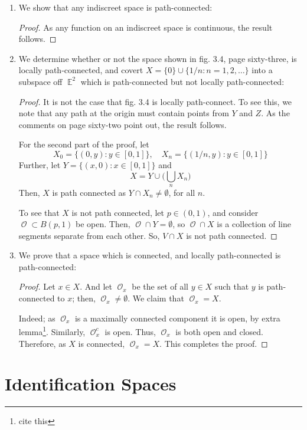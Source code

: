 \documentclass{book}
\DeclareMathOperator*{\E}{\mathbb{E}}
\DeclareMathOperator*{\Ocal}{\mathcal{O}}
\begin{document}
\begin{enumerate}[(1)]
    \item We show that any indiscreet space is path-connected: 
        \begin{proof} As any function on an indiscreet space is continuous, the result follows. 
        \end{proof}

    \item We determine whether or not the space shown in fig. 3.4, page sixty-three, is locally path-connected, and covert $X = \{0\} \cup \{ 1/n : n = 1,2, \dots \}$ into a subspace off $\E^2$ which is path-connected but not locally path-connected:
        \begin{proof} It is not the case that fig. 3.4 is locally path-connect. To see this, we note that any path at the origin must contain points from $Y$ and $Z$. As the comments on page sixty-two point out, the result follows.  
            \par For the second part of the proof, let 
            \[X_0 = \{(0,y) : y \in [0,1] \}, \quad X_n = \{(1/n, y) : y \in [0,1]\}\]
            Further, let $Y = \{(x,0) : x \in [0,1] \}$ and
            \[X = Y \cup \Big( \bigcup_n X_n \Big)\] 
            Then, $X$ is path connected as $Y \cap X_n \neq \emptyset$, for all $n$. \par To see that $X$ is not path connected, let $p \in (0,1)$, and consider $\Ocal \subset B(p,1)$ be open. Then, $\Ocal \cap Y = \emptyset$, so $\Ocal \cap X$ is a collection of line segments separate from each other. So, $V \cap X$ is not path connected. 
        \end{proof}

    \item We prove that a space which is connected, and locally path-connected is path-connected: 
        \begin{proof}  Let $x \in X$. And let $\Ocal_x$ be the set of all $y \in X$ such that $y$ is path-connected to $x$; then, $\Ocal_x \neq \emptyset$. We claim that $\Ocal_x = X$. 
            \par Indeed; as $\Ocal_x$ is a maximally connected component it is open, by extra lemma\footnote{cite this}. Similarly, $\Ocal_x^c$ is open. Thus, $\Ocal_x$ is both open and closed. Therefore, as $X$ is connected, $\Ocal_x = X$. This completes the proof. 
        \end{proof}

\end{enumerate}

\newpage
\chapter{Identification Spaces}
\end{document}
